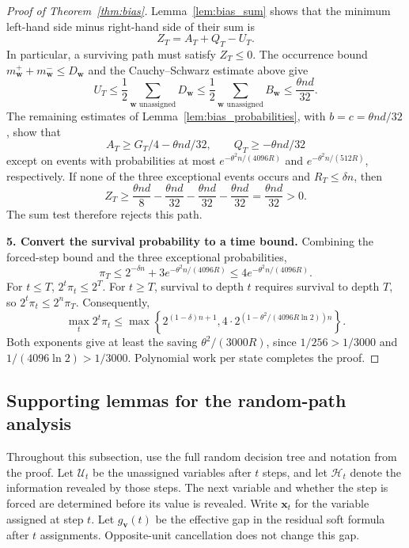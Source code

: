 \documentclass[11pt,a4paper]{article}
\theoremstyle{definition}
\theoremstyle{remark}
\begin{document}
\begin{proof}[Proof of Theorem~\ref{thm:bias}]
Lemma~\ref{lem:bias_sum} shows that the minimum left-hand side minus
right-hand side of their sum is
\begin{equation}
 Z_T=A_T+Q_T-U_T.\label{eq:race}
\end{equation}
In particular, a surviving path must satisfy $Z_T\le0$.
The occurrence bound $m_{\mathbf w}^++m_{\mathbf w}^-\le D_{\mathbf w}$
and the Cauchy--Schwarz estimate above give
\[
 U_T\le\frac12\sum_{\mathbf w\text{ unassigned}}D_{\mathbf w}
 \le\frac12\sum_{\mathbf w\text{ unassigned}}B_{\mathbf w}
 \le\frac{\theta nd}{32}.
\]
The remaining estimates of Lemma~\ref{lem:bias_probabilities}, with
$b=c=\theta nd/32$, show that
\[
 A_T\ge G_T/4-\theta nd/32,\qquad
 Q_T\ge-\theta nd/32
\]
except on events with probabilities at most
$e^{-\theta^2n/(4096R)}$ and $e^{-\theta^2n/(512R)}$, respectively.
If none of the three exceptional events occurs and $R_T\le\delta n$,
then
\[
 Z_T\ge\frac{\theta nd}{8}
        -\frac{\theta nd}{32}-\frac{\theta nd}{32}
        -\frac{\theta nd}{32}
      =\frac{\theta nd}{32}>0.
\]
The sum test therefore rejects this path.

\par\medskip\noindent\textbf{5. Convert the survival probability to a time bound.} 
Combining the forced-step bound and the three exceptional probabilities,
\[
 \pi_T\le2^{-\delta n}+3e^{-\theta^2n/(4096R)}
       \le4e^{-\theta^2n/(4096R)}.
\]
For $t\le T$, $2^t\pi_t\le2^T$. For $t\ge T$, survival to depth $t$
requires survival to depth $T$, so $2^t\pi_t\le2^n\pi_T$. Consequently,
\[
 \max_t2^t\pi_t\le
 \max\left\{2^{(1-\delta)n+1},
            4\cdot2^{(1-\theta^2/(4096R\ln2))n}\right\}.
\]
Both exponents give at least the saving
$\theta^2/(3000R)$, since $1/256>1/3000$ and
$1/(4096\ln2)>1/3000$. Polynomial work per state completes the proof.
\end{proof}

\subsection{Supporting lemmas for the random-path analysis}

Throughout this subsection, use the full random decision tree and notation
from the proof. Let $\mathcal U_t$ be the unassigned variables after $t$
steps, and let $\mathcal H_t$ denote the information revealed by those steps.
The next variable and whether the step is forced are determined before its
value is revealed. Write $\mathbf x_t$ for the variable assigned at step $t$.
Let $g_{\mathbf v}(t)$ be the effective gap in the residual soft formula
after $t$ assignments. Opposite-unit cancellation does not change this gap.
\end{document}
